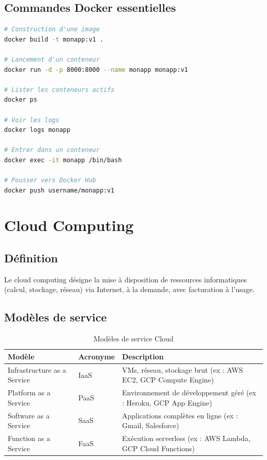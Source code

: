 \documentclass[12pt,a4paper]{article}
\begin{document}
\subsection{Commandes Docker essentielles}

\begin{lstlisting}[language=bash, caption=Commandes Docker courantes]
# Construction d'une image
docker build -t monapp:v1 .

# Lancement d'un conteneur
docker run -d -p 8000:8000 --name monapp monapp:v1

# Lister les conteneurs actifs
docker ps

# Voir les logs
docker logs monapp

# Entrer dans un conteneur
docker exec -it monapp /bin/bash

# Pousser vers Docker Hub
docker push username/monapp:v1
\end{lstlisting}

\section{Cloud Computing}

\subsection{Définition}

Le cloud computing désigne la mise à disposition de ressources informatiques (calcul, stockage, réseau) via Internet, à la demande, avec facturation à l'usage.

\subsection{Modèles de service}

\begin{table}[H]
\centering
\begin{tabular}{@{}llp{6cm}@{}}
\toprule
\textbf{Modèle} & \textbf{Acronyme} & \textbf{Description} \\
\midrule
Infrastructure as a Service & IaaS & VMs, réseau, stockage brut (ex : AWS EC2, GCP Compute Engine) \\
Platform as a Service & PaaS & Environnement de développement géré (ex : Heroku, GCP App Engine) \\
Software as a Service & SaaS & Applications complètes en ligne (ex : Gmail, Salesforce) \\
Function as a Service & FaaS & Exécution serverless (ex : AWS Lambda, GCP Cloud Functions) \\
\bottomrule
\end{tabular}
\caption{Modèles de service Cloud}
\end{table}
\end{document}
